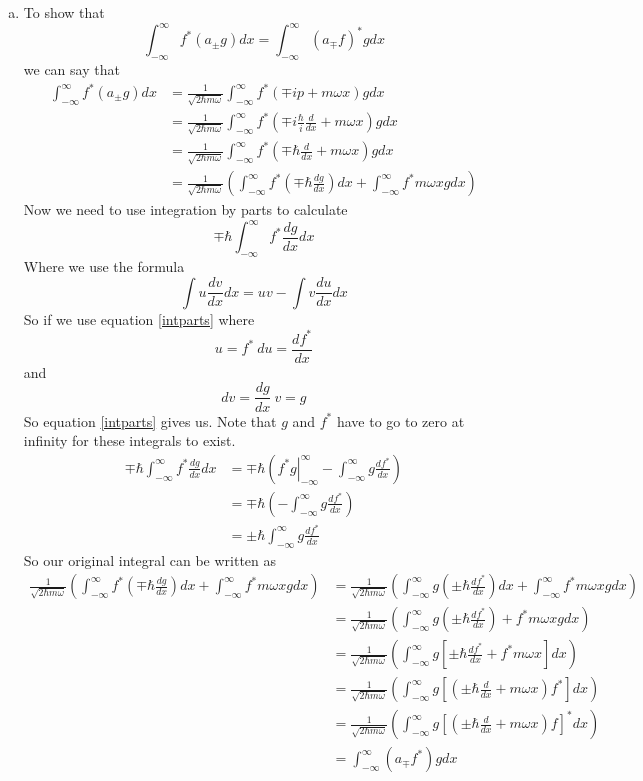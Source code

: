 \documentclass[11pt]{article}
\numberwithin{equation}{section}
\begin{document}
\begin{enumerate}[(a)]
\item
To show that
\begin{equation}
\int_{-\infty}^{\infty}f^*(a_{\pm}g)dx = \int_{-\infty}^{\infty}(a_{\mp}f)^*gdx
\label{partc}
\end{equation}
we can say that
\begin{align*}
\int_{-\infty}^{\infty}f^*(a_{\pm}g)dx &= \frac{1}{\sqrt{2\hbar m\omega}}\int_{-\infty}^{\infty}f^*\left(\mp ip+m\omega x\right)gdx\\
&= \frac{1}{\sqrt{2\hbar m\omega}}\int_{-\infty}^{\infty}f^*\left(\mp i\frac{\hbar}{i}\frac{d}{dx}+m\omega x\right)gdx\\
&= \frac{1}{\sqrt{2\hbar m\omega}}\int_{-\infty}^{\infty}f^*\left(\mp\hbar\frac{d}{dx}+m\omega x\right)gdx\\
&= \frac{1}{\sqrt{2\hbar m\omega}}\left(\int_{-\infty}^{\infty}f^*\left(\mp\hbar\frac{dg}{dx}\right)dx+\int_{-\infty}^{\infty}f^*m\omega xgdx\right)
\end{align*}
Now we need to use integration by parts to calculate
$$\mp\hbar\int_{-\infty}^{\infty}f^*\frac{dg}{dx}dx$$
Where we use the formula
\begin{equation}
\int u\frac{dv}{dx}dx = uv-\int v\frac{du}{dx}dx
\label{intparts}
\end{equation}
So if we use equation \ref{intparts} where
$$u = f^*\ du = \frac{df^*}{dx}$$
and
$$dv = \frac{dg}{dx}\ v = g$$
So equation \ref{intparts} gives us. Note that $g$ and $f^*$ have to go to zero at infinity for these integrals to exist.
\begin{align*}
\mp\hbar\int_{-\infty}^{\infty}f^*\frac{dg}{dx}dx &= \mp\hbar\left(\left.f^*g\right|_{-\infty}^{\infty} - \int_{-\infty}^{\infty}g\frac{df^*}{dx}\right)\\
&= \mp\hbar\left(- \int_{-\infty}^{\infty}g\frac{df^*}{dx}\right)\\
&= \pm\hbar\int_{-\infty}^{\infty}g\frac{df^*}{dx}
\end{align*}
So our original integral can be written as
\begin{align*}
\frac{1}{\sqrt{2\hbar m\omega}}\left(\int_{-\infty}^{\infty}f^*\left(\mp\hbar\frac{dg}{dx}\right)dx+\int_{-\infty}^{\infty}f^*m\omega xgdx\right) &= \frac{1}{\sqrt{2\hbar m\omega}}\left(\int_{-\infty}^{\infty}g\left(\pm\hbar\frac{df^*}{dx}\right)dx+\int_{-\infty}^{\infty}f^*m\omega xgdx\right)\\
&= \frac{1}{\sqrt{2\hbar m\omega}}\left(\int_{-\infty}^{\infty}g\left(\pm\hbar\frac{df^*}{dx}\right) + f^*m\omega xgdx\right)\\
&= \frac{1}{\sqrt{2\hbar m\omega}}\left(\int_{-\infty}^{\infty}g\left[\pm\hbar\frac{df^*}{dx} + f^*m\omega x\right]dx\right)\\
&= \frac{1}{\sqrt{2\hbar m\omega}}\left(\int_{-\infty}^{\infty}g\left[\left(\pm\hbar\frac{d}{dx} + m\omega x\right)f^*\right]dx\right)\\
&= \frac{1}{\sqrt{2\hbar m\omega}}\left(\int_{-\infty}^{\infty}g\left[\left(\pm\hbar\frac{d}{dx} + m\omega x\right)f\right]^*dx\right)\\
&= \int_{-\infty}^{\infty}(a_{\mp}f^*)gdx
\end{align*}



\end{enumerate}
\end{document}
